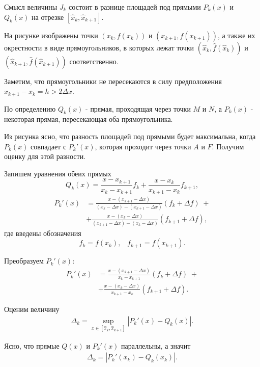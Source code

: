 \documentclass[10pt, twocolumn]{article}
\begin{document}
Смысл величины $J_k$ состоит в разнице площадей под прямыми $P_k(x)$ и $Q_k(x)$ на отрезке $[\hat{x}_k, \hat{x}_{k + 1}]$.

На рисунке изображены точки $(x_k, f(x_k))$ и $(x_{k + 1}, f(x_{k + 1}))$, а также их окрестности в виде прямоугольников, в которых лежат точки $(\hat{x}_k, \hat{f}(\hat{x}_k))$ и $(\hat{x}_{k + 1}, \hat{f}(\hat{x}_{k + 1}))$ соответственно.

Заметим, что прямоугольники не пересекаются в силу предположения $x_{k + 1} - x_k = h > 2 \Delta x$.

По определению $Q_k(x)$ - прямая, проходящая через точки $M$ и $N$, а $P_k(x)$ - некоторая прямая, пересекающая оба прямоугольника.

Из рисунка ясно, что разность площадей под прямыми будет максимальна, когда $P_k(x)$ совпадает с $P_k'(x)$, которая проходит через точки $A$ и $F$.
Получим оценку для этой разности.

Запишем уравнения обеих прямых
\begin{equation*}
  Q_k(x) = \frac{x - x_{k + 1}}{x_k - x_{k + 1}} f_k + \frac{x - x_k}{x_{k + 1} - x_k} f_{k + 1},
\end{equation*}
\begin{align*}
  P_k'(x) &= \frac{x - (x_{k + 1} - \Delta x)}{(x_k - \Delta x) - (x_{k + 1} - \Delta x)} (f_k + \Delta f) \; +\\
        &+ \frac{x - (x_k - \Delta x)}{(x_{k + 1} - \Delta x) - (x_k - \Delta x)} (f_{k + 1} + \Delta f),
\end{align*}
где введены обозначения
\begin{equation*}
  f_k = f(x_k), \;\;\; f_{k + 1} = f(x_{k + 1}).
\end{equation*}

Преобразуем $P_k'(x)$:
\begin{align*}
  P_k'(x) &= \frac{x - (x_{k + 1} - \Delta x)}{x_k - x_{k + 1}} (f_k + \Delta f) \; +\\
          &+ \frac{x - (x_k - \Delta x)}{x_{k + 1} - x_k} (f_{k + 1} + \Delta f).
\end{align*}

Оценим величину
\begin{align*}
  \Delta_k = \sup \limits_{x \in [\hat{x}_k, \hat{x}_{k + 1}]} \left| P_k'(x) - Q_k(x) \right|.
\end{align*}

Ясно, что прямые $Q(x)$ и $P_k'(x)$ параллельны, а значит
\begin{align*}
  \Delta_k = \left| P_k'(x_k) - Q_k(x_k) \right|.
\end{align*}
\end{document}
